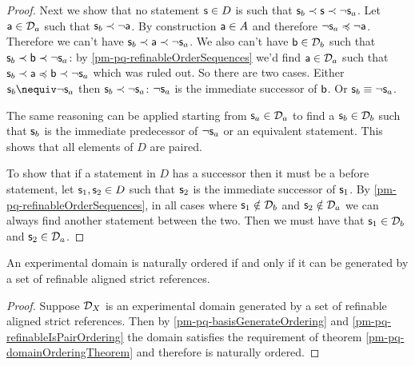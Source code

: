 \begin{mathSection}
\begin{proof}
		Next we show that no statement $\stmt \in D$ is such that $\stmt_b \snarrower \stmt \snarrower \NOT \stmt_a$. Let $\stmt[a] \in \edomain_a$ such that $\stmt_b \snarrower \NOT \stmt[a]$. By construction $\stmt[a] \in A$ and therefore $\NOT \stmt_a \narrower \NOT \stmt[a]$. Therefore we can't have $\stmt_b \snarrower \stmt[a] \snarrower \NOT \stmt_a$. We also can't have $\stmt[b] \in \edomain_b$ such that $\stmt_b \snarrower \stmt[b] \snarrower \NOT \stmt_a$: by \ref{pm-pq-refinableOrderSequences} we'd find $\stmt[a] \in \edomain_a$ such that $\stmt_b \snarrower \stmt[a] \narrower \stmt[b] \snarrower \NOT \stmt_a$ which was ruled out. So there are two cases. Either $\stmt_b \nequiv \NOT \stmt_a$ then $\stmt_b \snarrower \NOT \stmt_a$: $\NOT \stmt_a$ is the immediate successor of $\stmt[b]$. Or $\stmt_b \equiv \NOT \stmt_a$.
		
		The same reasoning can be applied starting from $\stmt_a \in \edomain_a$ to find a $\stmt_b \in \edomain_b$ such that $\stmt_b$ is the immediate predecessor of $\NOT \stmt_a$ or an equivalent statement. This shows that all elements of $D$ are paired.
		
		To show that if a statement in $D$ has a successor then it must be a before statement, let $\stmt_1, \stmt_2 \in D$ such that $\stmt_2$ is the immediate successor of $\stmt_1$. By \ref{pm-pq-refinableOrderSequences}, in all cases where $\stmt_1 \notin \edomain_b$ and $\stmt_2 \notin \edomain_a$ we can always find another statement between the two. Then we must have that $\stmt_1 \in \edomain_b$ and $\stmt_2 \in \edomain_a$.
	\end{proof}
	
	\begin{thrm}\label{pm-pq-referenceOrderingTheorem}
		An experimental domain is naturally ordered if and only if it can be generated by a set of refinable aligned strict references.
	\end{thrm}
	\begin{proof}
		Suppose $\edomain_X$ is an experimental domain generated by a set of refinable aligned strict references. Then by \ref{pm-pq-basisGenerateOrdering} and \ref{pm-pq-refinableIsPairOrdering} the domain satisfies the requirement of theorem \ref{pm-pq-domainOrderingTheorem} and therefore is naturally ordered.
		

\end{proof}
\end{mathSection}

